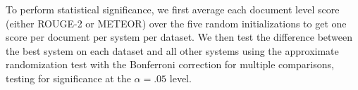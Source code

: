 








To perform statistical significance, we first average each document level score
(either ROUGE-2 or METEOR) over the five random initializations to get
one score per document per system per dataset.
We then test the difference between the best system on each dataset and 
all other systems using the approximate randomization test 
\cite{riezler2005some} with the Bonferroni correction for multiple comparisons,
testing for significance at the $\alpha=.05$ level. 




